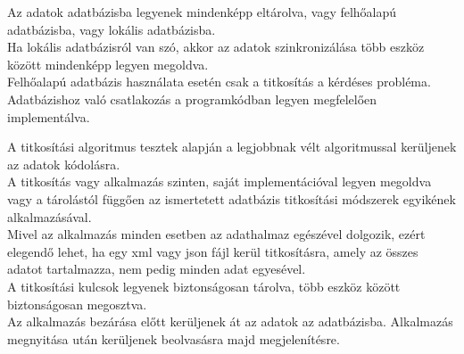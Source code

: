 Az adatok adatbázisba legyenek mindenképp eltárolva, vagy felhőalapú adatbázisba, vagy lokális adatbázisba. 
\\Ha lokális adatbázisról van szó, akkor az adatok szinkronizálása több eszköz között mindenképp legyen megoldva.
\\Felhőalapú adatbázis használata esetén csak a titkosítás a kérdéses probléma.
\\Adatbázishoz való csatlakozás a programkódban legyen megfelelően implementálva.


A titkosítási algoritmus tesztek alapján a legjobbnak vélt algoritmussal kerüljenek az adatok kódolásra.
\\A titkosítás vagy alkalmazás szinten, saját implementációval legyen megoldva vagy a tárolástól függően az ismertetett adatbázis titkosítási módszerek egyikének alkalmazásával.
\\Mivel az alkalmazás minden esetben az adathalmaz egészével dolgozik, ezért elegendő lehet, ha egy xml vagy json fájl kerül titkosításra, amely az összes adatot tartalmazza, nem pedig minden adat egyesével.
\\A titkosítási kulcsok legyenek biztonságosan tárolva, több eszköz között biztonságosan megosztva.
\\Az alkalmazás bezárása előtt kerüljenek át az adatok az adatbázisba. Alkalmazás megnyitása után kerüljenek beolvasásra majd megjelenítésre.
